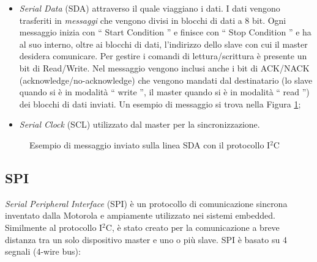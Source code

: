 \documentclass[12pt]{report}
\begin{document}
\begin{itemize}
	\item \emph{Serial Data} (SDA) attraverso il quale viaggiano i dati. I dati vengono trasferiti in \textit{messaggi} che vengono divisi in blocchi di dati a 8 bit. Ogni messaggio inizia con  \textquotedblleft{} Start Condition \textquotedblright{} e finisce con \textquotedblleft{} Stop Condition \textquotedblright{} e ha al suo interno, oltre ai blocchi di dati, l'indirizzo dello slave con cui il master desidera comunicare. Per gestire i comandi di lettura/scrittura è presente un bit di Read/Write. Nel messaggio vengono inclusi anche i bit di ACK/NACK (acknowledge/no-acknowledge) che vengono mandati dal destinatario (lo slave quando si è in modalità \textquotedblleft{} write \textquotedblright{}, il master quando si è in modalità \textquotedblleft{} read \textquotedblright{}) dei blocchi di dati inviati. Un esempio di messaggio si trova nella Figura \ref{fig:i2c_data_bus};
	\item \emph{Serial Clock} (SCL) utilizzato dal master per la sincronizzazione.
\end{itemize}

\begin{figure}[H]
	\caption{Esempio di messaggio inviato sulla linea SDA con il protocollo I$^2$C }
	\label{fig:i2c_data_bus}
\end{figure}


%
\subsection{SPI}\label{sec:spi}
% 

\emph{Serial Peripheral Interface} (SPI) è un protocollo di comunicazione sincrona inventato dalla Motorola e ampiamente utilizzato nei sistemi embedded. Similmente al protocollo I$^2$C, è stato creato per la comunicazione a breve distanza tra un solo dispositivo master e uno o più slave.
SPI è basato su 4 segnali (4-wire bus):
\end{document}
